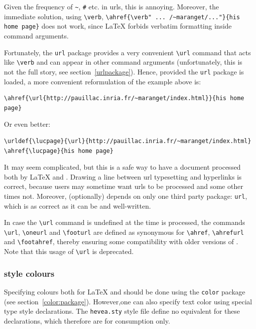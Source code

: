 Given the frequency of \verb+~+, \verb+#+ etc. in urls,
this is annoying. Moreover, the immediate solution, using \verb+\verb+,
\verb+\ahref{\verb" ... /~maranget/..."}{his home page}+
does not work, since \LaTeX{} forbids verbatim formatting
inside command arguments.

Fortunately, the \texttt{url} package provides a very convenient
\verb+\url+ command that acts like \verb+\verb+ and can appear in
other command arguments
(unfortunately, this is not the full story, see section~\ref{urlpackage}).
Hence, provided the \texttt{url} package is loaded,
a more convenient reformulation of the example above is:
\begin{verbatim}
\ahref{\url{http://pauillac.inria.fr/~maranget/index.html}}{his home page}
\end{verbatim}
Or even better:
\begin{verbatim}
\urldef{\lucpage}{\url}{http://pauillac.inria.fr/~maranget/index.html}
\ahref{\lucpage}{his home page}
\end{verbatim}
It may seem complicated, but this is a safe way to have a
document processed both by \LaTeX{} and \hevea{}.
Drawing a line between url typesetting and hyperlinks is correct,
because users may sometime want urls to be processed and some other
times not.
Moreover, \hevea{} (optionally) depends on only one third party package:
\texttt{url}, which is as correct as it can be and well-written.



In case the \verb+\url+ command is undefined
at the time \verb++ is processed, the commands
\verb+\url+, \verb+\oneurl+ and \verb+\footurl+ are defined as
synonymous for
\verb+\ahref+, \verb+\ahrefurl+ and \verb+\footahref+, thereby
ensuring
some compatibility with older versions of \hevea.
Note that this usage of \verb+\url+ is deprecated.

\subsubsection{\html{} style colours}\label{color:high}
Specifying colours both for \LaTeX{} and
\hevea{} should be done using the \texttt{color} package (see
section~\ref{color:package}).
However,one can also specify text color using special type style declarations.
The \texttt{hevea.sty} style file
define no equivalent for these declarations, which therefore are for
\hevea{} consumption only.


